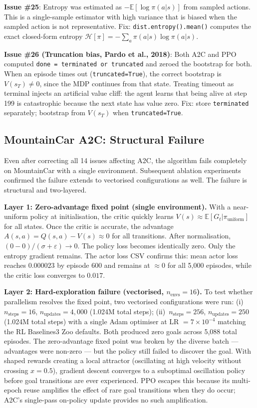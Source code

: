 \documentclass[a4paper,12pt]{article}
\begin{document}
\textbf{Issue \#25}: Entropy was estimated as $-\mathbb{E}[\log\pi(a|s)]$ from sampled actions. This is a single-sample estimator with high variance that is biased when the sampled action is not representative. Fix: \texttt{dist.entropy().mean()} computes the exact closed-form entropy $\mathcal{H}[\pi] = -\sum_a \pi(a|s)\log\pi(a|s)$.

\textbf{Issue \#26 (Truncation bias, Pardo et al., 2018)}: Both A2C and PPO computed \texttt{done = terminated or truncated} and zeroed the bootstrap for both. When an episode times out (\texttt{truncated=True}), the correct bootstrap is $V(s_T) \neq 0$, since the MDP continues from that state. Treating timeout as terminal injects an artificial value cliff: the agent learns that being alive at step 199 is catastrophic because the next state has value zero. Fix: store \texttt{terminated} separately; bootstrap from $V(s_T)$ when \texttt{truncated=True}.

\subsection{MountainCar A2C: Structural Failure}
\label{sec:ac_structural}

Even after correcting all 14 issues affecting A2C, the algorithm fails completely on MountainCar with a single environment. Subsequent ablation experiments confirmed the failure extends to vectorised configurations as well. The failure is structural and two-layered.

\textbf{Layer 1: Zero-advantage fixed point (single environment).} With a near-uniform policy at initialisation, the critic quickly learns $V(s) \approx \mathbb{E}[G_t | \pi_{\text{uniform}}]$ for all states. Once the critic is accurate, the advantage $A(s,a) = Q(s,a) - V(s) \approx 0$ for all transitions. After normalisation, $(0 - 0)/(\sigma + \varepsilon) \rightarrow 0$. The policy loss becomes identically zero. Only the entropy gradient remains. The actor loss CSV confirms this: mean actor loss reaches $0.000023$ by episode 600 and remains at $\approx 0$ for all 5,000 episodes, while the critic loss converges to $0.017$.

\textbf{Layer 2: Hard-exploration failure (vectorised, $n_\text{envs}=16$).} To test whether parallelism resolves the fixed point, two vectorised configurations were run: (i)~$n_\text{steps}=16$, $n_\text{updates}=4{,}000$ (1.024M total steps); (ii)~$n_\text{steps}=256$, $n_\text{updates}=250$ (1.024M total steps) with a single Adam optimiser at LR $=7\times10^{-4}$ matching the RL Baselines3 Zoo defaults. Both produced zero goals across 5,088 total episodes. The zero-advantage fixed point was broken by the diverse batch --- advantages were non-zero --- but the policy still failed to discover the goal. With shaped rewards creating a local attractor (oscillating at high velocity without crossing $x=0.5$), gradient descent converges to a suboptimal oscillation policy before goal transitions are ever experienced. PPO escapes this because its multi-epoch reuse amplifies the effect of rare goal transitions when they do occur; A2C's single-pass on-policy update provides no such amplification.
\end{document}
